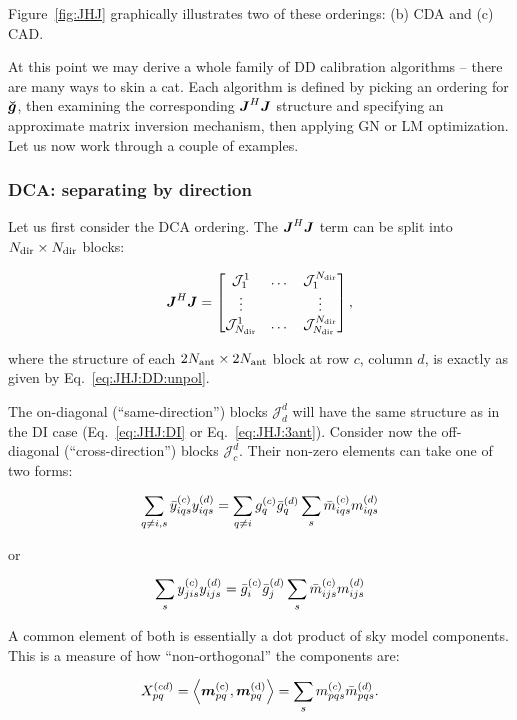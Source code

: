 \documentclass[useAMS,usenatbib]{mn2e}
\newcommand{\mat}[1]{{\bmath{#1}}}
\newcommand{\JJ}{\mat{J}} %
\newcommand{\JHJ}{\JJ^H\JJ} %
\begin{document}
Figure~\ref{fig:JHJ} graphically illustrates two of these orderings: (b) CDA and (c) CAD.

At this point we may derive a whole family of DD calibration algorithms -- there are many ways to skin a cat. Each 
algorithm is defined by picking an ordering for $\Gg$, then examining the corresponding $\JHJ$ structure and specifying 
an approximate matrix inversion mechanism, then applying GN or LM optimization. Let us now work through a couple of examples.

\subsubsection{DCA: separating by direction}

Let us first consider the DCA ordering. The $\JHJ$ term can be split into $N_\mathrm{dir}\times N_\mathrm{dir}$ blocks:

\newcommand{\JJJ}{\mathcal{J}}

\begin{equation}
\label{eq:JHJ:DD:blocked}
\JHJ = \Matrix{ccc}{\JJJ^1_1 & \dots & \JJJ^{\Nd}_1 \\
\vdots & & \vdots \\
\JJJ_{\Nd}^1 & \dots & \JJJ_{\Nd}^{\Nd} },
\end{equation}

where the structure of each $2N_\mathrm{ant}\times2N_\mathrm{ant}$ block at row $c$, column $d$, is exactly as 
given by Eq.~\ref{eq:JHJ:DD:unpol}. 


The on-diagonal (``same-direction'') blocks $\JJJ^d_d$ will have the same structure as in the DI 
case (Eq.~\ref{eq:JHJ:DI} or Eq.~\ref{eq:JHJ:3ant}). Consider now the off-diagonal (``cross-direction'') 
blocks $\JJJ^d_c$. Their non-zero elements can take one of two forms:

\[
  \sum\limits_{q\ne i,s} \bar{y}^{(c)}_{iqs} y^{(d)}_{iqs} = \sum\limits_{q\ne i} g^{(c)}_q \bar{g}^{(d)}_q \sum_s \bar{m}^{(c)}_{iqs} m^{(d)}_{iqs}
\]

or

\begin{equation}
  \sum\limits_{s} y^{(c)}_{jis} y^{(d)}_{ijs} = \bar{g}^{(c)}_i \bar{g}^{(d)}_j \sum_s \bar{m}^{(c)}_{ijs} m^{(d)}_{ijs}
\label{eq:JHJ:DD:crossterms}
\end{equation}

A common element of both is essentially a dot product of sky model components. This is a 
measure of how ``non-orthogonal'' the components are:

\begin{equation}
\label{eq:Xpqcd}
X_{pq}^{(cd)} = \left \langle \bmath{m}_{pq}^\mathrm{(c)},\bmath{m}^\mathrm{(d)}_{pq} \right \rangle = \sum_s \mmc_{pqs} \mmdH_{pqs}.
\end{equation}
\end{document}
